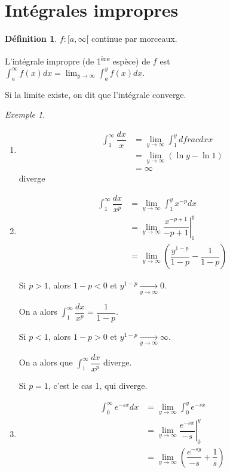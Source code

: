 \documentclass{report}
\newcommand*{\dlim}[3]{\displaystyle\lim_{#1 \to #2}#3}
\newcommand*{\dint}[3]{\displaystyle\int_{#1}^{#2}#3}
\theoremstyle{definition}
\newtheorem*{defin}{D\'efinition}
\theoremstyle{remark}
\newtheorem*{exem}{Exemple}
\begin{document}
	\section{Int\'egrales impropres}
	\begin{defin}
		$f:[a,\infty[$ continue par morceaux.

		L'int\'egrale impropre (de 1\textsuperscript{\`ere} esp\`ece) de $f$ est $\dint{a}{\infty}{f(x)dx} = \dlim{y}{\infty}{\dint{a}{y}{f(x)dx}}$.

		Si la limite existe, on dit que l'int\'egrale converge.
		\begin{exem}~

			\begin{enumerate}
				\item \begin{align*}
					\dint{1}{\infty}{\dfrac{dx}{x}}&= \dlim{y}{\infty}{\dint{1}{y}{dfrac{dx}{x}}}\\
					&= \dlim{y}{\infty}{(\ln y - \ln1)}\\
					&= \infty
				\end{align*}
				diverge
				\item \begin{align*}
					\dint{1}{\infty}{\dfrac{dx}{x^p}}&= \dlim{y}{\infty}{\dint{1}{y}{x^{-p}dx}}\\
					&= \left. \dlim{y}{\infty}{\dfrac{x^{-p+1}}{-p+1}} \right| ^y_1\\
					&= \dlim{y}{\infty}{\left( \dfrac{y^{1-p}}{1-p} - \dfrac{1}{1-p} \right)}
				\end{align*}

				Si $p>1$, alors $1-p<0$ et $y^{1-p} \xrightarrow[y \to \infty]{} 0$.

				On a alors $\dint{1}{\infty}{\dfrac{dx}{x^p}} = \dfrac{1}{1-p}$.

				Si $p<1$, alors $1-p>0$ et $y^{1-p} \xrightarrow[y \to \infty]{} \infty$.

				On a alors que $\dint{1}{\infty}{\dfrac{dx}{x^p}}$ diverge.

				Si $p=1$, c'est le cas 1, qui diverge.
				\item \begin{align*}
					\dint{0}{\infty}{e^{-sx}dx}&= \dlim{y}{\infty}{\dint{0}{y}{e^{-sx}}}\\
					&= \left. \dlim{y}{\infty}{\dfrac{e^{-sx}}{-s}} \right|^y_0\\
					&= \dlim{y}{\infty}{\left( \dfrac{e^{-sy}}{-s} + \dfrac{1}{s} \right)}
				\end{align*}


\end{enumerate}
\end{exem}
\end{defin}
\end{document}
